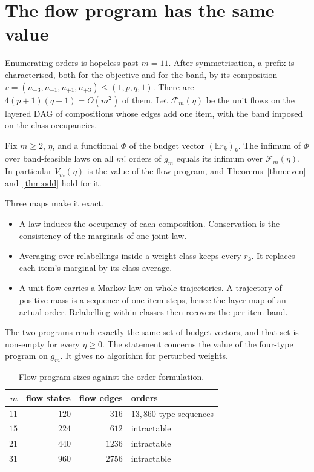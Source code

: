 \section{The flow program has the same value}
\label{sec:flow}

Enumerating orders is hopeless past $m=11$. After symmetrisation, a prefix is characterised,
both for the objective and for the band, by its composition
$v=(n_{-3},n_{-1},n_{+1},n_{+3})\le(1,p,q,1)$. There are $4(p+1)(q+1)=O(m^{2})$ of them. Let
$\mathcal{F}_{m}(\eta)$ be the unit flows on the layered DAG of compositions whose edges add
one item, with the band imposed on the class occupancies.

\begin{theorem}
\label{thm:flow}
Fix $m\ge2$, $\eta$, and a functional $\Phi$ of the budget vector $(\mathbb{E}r_{k})_{k}$. The
infimum of $\Phi$ over band-feasible laws on all $m!$ orders of $g_{m}$ equals its infimum
over $\mathcal{F}_{m}(\eta)$. In particular $V_{m}(\eta)$ is the value of the flow program,
and Theorems~\ref{thm:even} and~\ref{thm:odd} hold for it.
\end{theorem}


Three maps make it exact.
\begin{itemize}
\item A law induces the occupancy of each composition. Conservation is the consistency of the
marginals of one joint law.
\item Averaging over relabellings inside a weight class keeps every $r_{k}$. It replaces each
item's marginal by its class average.
\item A unit flow carries a Markov law on whole trajectories. A trajectory of positive mass is
a sequence of one-item steps, hence the layer map of an actual order. Relabelling within
classes then recovers the per-item band.
\end{itemize}
The two programs reach exactly the same set of budget vectors, and that set is non-empty for
every $\eta\ge0$. The statement concerns the value of the four-type program on $g_{m}$. It
gives no algorithm for perturbed weights.

\begin{table}[t]
\caption{Flow-program sizes against the order formulation. \NUM{}}
\label{tab:agree}
\centering
\footnotesize
\begin{tabular}{@{}rrrl@{}}
\toprule
$m$ & flow states & flow edges & orders \\
\midrule
$11$ & $120$ & $316$ & $13{,}860$ type sequences \\
$15$ & $224$ & $612$ & intractable \\
$21$ & $440$ & $1236$ & intractable \\
$31$ & $960$ & $2756$ & intractable \\
\bottomrule
\end{tabular}
\end{table}

